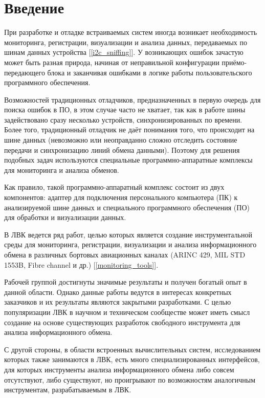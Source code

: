 \section{Введение}

При разработке и отладке встраиваемых систем иногда возникает необходимость мониторинга, регистрации, визуализации и анализа данных, передаваемых по шинам данных устройства [\ref{i2c_sniffing}]. У возникающих ошибок зачастую может быть разная природа, начиная от неправильной конфигурации приёмо-передающего блока и заканчивая ошибками в логике работы пользовательского программного обеспечения.

Возможностей традиционных отладчиков, предназначенных в первую очередь для поиска ошибок в ПО, в этом случае часто не хватает, так как в работе шины задействовано сразу несколько устройств, синхронизированных по времени. Более того, традиционный отладчик не даёт понимания того, что происходит на шине данных (невозможно или неоправданно сложно отследить состояние передачи и синхронизацию линий обмена данными). Поэтому для решения подобных задач используются специальные программно-аппаратные комплексы для мониторинга и анализа обменов.

Как правило, такой программно-аппаратный комплекс состоит из двух компонентов: адаптер для подключения персонального компьютера (ПК) к анализируемой шине данных и специального программного обеспечения (ПО) для обработки и визуализации данных.

В ЛВК ведется ряд работ, целью которых является создание инструментальной среды для мониторинга, регистрации, визуализации и анализа информационного обмена в различных бортовых авиационных каналах (ARINC 429, MIL STD 1553B, Fibre channel и др.) [\ref{monitoring_tools}].

Рабочей группой достигнуты значимые результаты и получен богатый опыт в данной области. Однако данные работы ведутся в интересах конкретных заказчиков и их результаты являются закрытыми разработками. С целью популяризации ЛВК в научном и техническом сообществе может иметь смысл создание на основе существующих разработок свободного инструмента для анализа информационного обмена.

С другой стороны, в области встроенных вычислительных систем, исследованием которых также занимаются в ЛВК, есть много специализированных интерфейсов, для которых инструменты анализа информационного обмена либо совсем отсутствуют, либо существуют, но проигрывают по возможностям аналогичным инструментам, разрабатываемым в ЛВК.


